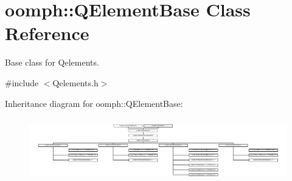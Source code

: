\hypertarget{classoomph_1_1QElementBase}{}\section{oomph\+:\+:Q\+Element\+Base Class Reference}
\label{classoomph_1_1QElementBase}


Base class for Qelements.  




{\ttfamily \#include $<$Qelements.\+h$>$}

Inheritance diagram for oomph\+:\+:Q\+Element\+Base\+:\begin{figure}[H]
\begin{center}
\leavevmode
\includegraphics[height=2.830883cm]{classoomph_1_1QElementBase}
\end{center}
\end{figure}
